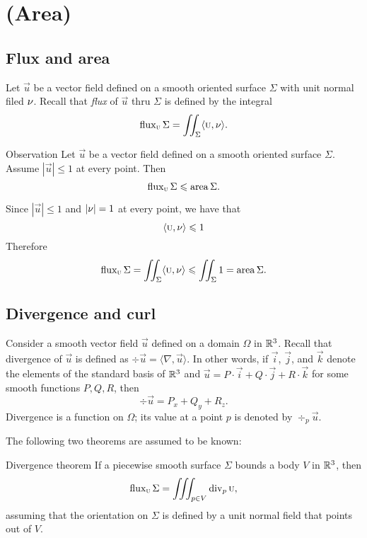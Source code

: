 \chapter{(Area)}

\section{Flux and area}

Let $\vec u$ be a vector field defined on a smooth oriented surface $\Sigma$ with unit normal filed $\nu$.
Recall that \emph{flux} of $\vec u$ thru $\Sigma$ is defined by the integral 
\[\mathop{\rm flux}\nolimits_{\textsc u}\Sigma=\iint_\Sigma \langle \textsc u,\nu\rangle.\]

\begin{thm}{Observation}\label{obs:flux}
Let $\vec u$ be a vector field defined on a smooth oriented surface $\Sigma$.
Assume $|\vec u|\le 1$ at every point.
Then 
\[\mathop{\rm flux}\nolimits_{\textsc u}\Sigma \leqslant \mathop{\rm area}\nolimits\Sigma.\]
\end{thm}

Since $|\vec u|\le 1$ and $|\nu|=1$ at every point,
we have that
\[\langle\textsc u,\nu\rangle\leqslant 1\]
Therefore 
\[\mathop{\rm flux}\nolimits_{\textsc u}\Sigma=\iint_\Sigma \langle\textsc u,\nu\rangle\leqslant \iint_\Sigma1=\mathop{\rm area}\nolimits\Sigma.\]
\qedsf
\section{Divergence and curl}


Consider a smooth vector field $\vec u$ defined on a domain $\Omega$ in $\mathbb{R}^3$.
Recall that divergence of $\vec u$ is defined as $\div\vec u=\langle \nabla,\vec u\rangle$.
In other words, if $\vec i$, $\vec j$, and $\vec k$ denote the elements of the standard basis of  $\mathbb{R}^3$ and
$\vec u=P\cdot \vec i+Q\cdot\vec j+R\cdot\vec k$
for some smooth functions $P,Q,R$,
then
\[\div\vec u= P_x+Q_y+R_z.\]
Divergence is a function on $\Omega$;
its value at a point $p$ is denoted by $\div_p\vec u$.

The following two theorems are assumed to be known:

\begin{thm}{Divergence theorem}\label{thm:div}
If a piecewise smooth surface $\Sigma$ bounds a body $V$ in $\mathbb{R}^3$, then
\[\mathop{\rm flux}\nolimits_{\textsc u}\Sigma=\iiint_{p\in V}\mathop{\rm div}\nolimits_p \textsc u,\]
assuming that the orientation on $\Sigma$ is defined by a unit normal field that points out of $V$.
\end{thm}

